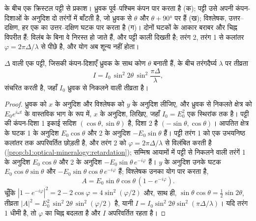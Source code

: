 \begin{omfigure}
{\small {} के बीच एक क्रिस्टल पट्टी से प्रकाश। ध्रुवक पूर्व–पश्चिम कंपन पार करता है (क); पट्टी उसे अपनी
कंपन-दिशाओं के अनुदिश दो तरंगों में बाँटती है, जो ध्रुवक से $\theta$ और $\theta + \ang{90}$ पर हैं (ख); विश्लेषक, उत्तर–दक्षिण,
हर एक का उत्तर–दक्षिण घटक पार करता है (ग)। दोनों घटकों के आकार बराबर और चिह्न विपरीत हैं: विलंब के बिना वे
निरस्त हो जाते हैं, और पट्टी काली दिखती है; तरंग 2, तरंग 1 से कलांतर $\varphi = 2\pi\Delta/\lambda$ से पीछे है, और योग
अब शून्य नहीं होता।}
\end{omfigure}

\begin{theorem}[आड़े ध्रुवकों के बीच तीव्रता]\label{thm:b1:optical-mineralogy:intensity}
 $\Delta$ वाली एक पट्टी, जिसकी कंपन-दिशाएँ ध्रुवक के साथ कोण $\theta$ बनाती हैं,  के बीच तरंगदैर्घ्य
$\lambda$ पर तीव्रता
\[
  I = I_0\,\sin^2 2\theta\,\sin^2\frac{\pi\Delta}{\lambda},
\]
संचरित करती है, जहाँ $I_0$ ध्रुवक से निकलने वाली तीव्रता है।
\end{theorem}

\begin{proof}
ध्रुवक को $x$ के अनुदिश और विश्लेषक को $y$ के अनुदिश लीजिए, और ध्रुवक से निकलते क्षेत्र को
$E_0 e^{i\omega t}$ के वास्तविक भाग के रूप में, $x$ के अनुदिश, लिखिए, जहाँ $I_0 = E_0^2$ एक स्थिरांक तक है। पट्टी की कंपन-दिशा 1 इकाई
सदिश $(\cos\theta, \sin\theta)$ है, दिशा 2 है $(-\sin\theta, \cos\theta)$। आपतित क्षेत्र के घटक 1 के अनुदिश $E_0\cos\theta$ और
2 के अनुदिश $-E_0\sin\theta$ हैं। पट्टी तरंग 1 को एक उभयनिष्ठ कलांतर तक अपरिवर्तित छोड़ती है, और तरंग 2 को
$\varphi = 2\pi\Delta/\lambda$ से विलंबित करती है (\cref{prop:b1:optical-mineralogy:retardation}); सम्मिश्र आयामों में
पट्टी से निकलने वाली तरंगें 1 के अनुदिश $E_0\cos\theta$ और 2 के अनुदिश $-E_0\sin\theta\,e^{-i\varphi}$ हैं। $y$ के अनुदिश उनके
घटक $E_0\cos\theta\sin\theta$ और $-E_0\sin\theta\cos\theta\,e^{-i\varphi}$ हैं; विश्लेषक उनका योग पार करता है,
\[
  A = E_0\sin\theta\cos\theta\,(1 - e^{-i\varphi}) .
\]
चूँकि $|1 - e^{-i\varphi}|^2 = 2 - 2\cos\varphi = 4\sin^2(\varphi/2)$ और, साथ ही,
$\sin\theta\cos\theta = \frac12\sin2\theta$, तीव्रता $|A|^2 = E_0^2\,\sin^2 2\theta\,\sin^2(\varphi/2)$ है, यानी
$I = I_0\sin^2 2\theta\sin^2(\pi\Delta/\lambda)$। यदि तरंग 1 धीमी है, तो $\varphi$ का चिह्न बदलता है और $I$ अपरिवर्तित रहता है।
\end{proof}

